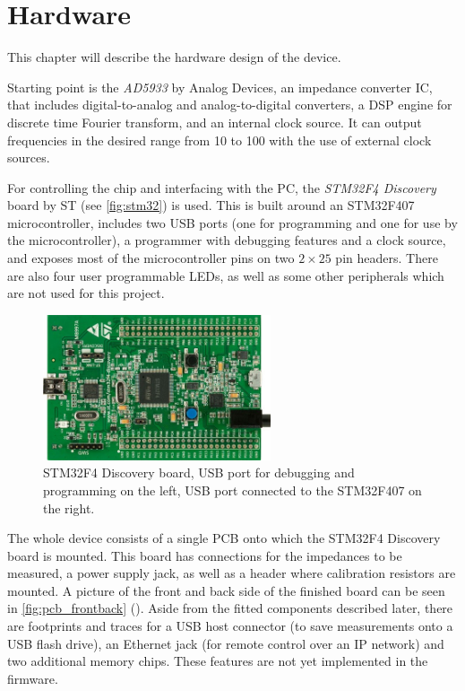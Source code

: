 \chapter{Hardware} \label{sec:hardware}

This chapter will describe the hardware design of the device.

Starting point is the \emph{AD5933} by Analog Devices, an impedance converter IC, that includes digital-to-analog and
analog-to-digital converters, a DSP engine for discrete time Fourier transform, and an internal clock source. It can
output frequencies in the desired range from \unit{10}{\hertz} to \unit{100}{\kilo\hertz} with the use of external
clock sources.

For controlling the chip and interfacing with the PC, the \emph{STM32F4 Discovery} board by ST (see \autoref{fig:stm32})
is used. This is built around an STM32F407 microcontroller, includes two USB ports (one for programming and one for use
by the microcontroller), a programmer with debugging features and a clock source, and exposes most of the microcontroller
pins on two $ 2 \times 25 $ pin headers. There are also four user programmable LEDs, as well as some other peripherals
which are not used for this project.

\begin{figure}[htpb]
  \centering
    \includegraphics[width=0.6\textwidth]{bilder/stm32.jpg}
  \caption[STM32F4 Discovery board.]{STM32F4 Discovery board\footnotemark{}, USB port for debugging and programming
    on the left, USB port connected to the STM32F407 on the right.}
  \label{fig:stm32}
\end{figure}

The whole device consists of a single PCB onto which the STM32F4 Discovery board is mounted. This board has connections
for the impedances to be measured, a power supply jack, as well as a header where calibration resistors are mounted.
A picture of the front and back side of the finished board can be seen in \autoref{fig:pcb_frontback}
(). Aside from the fitted components described later, there are footprints and traces
for a USB host connector (to save measurements onto a USB flash drive), an Ethernet jack (for remote control over
an IP network) and two additional memory chips. These features are not yet implemented in the firmware.

